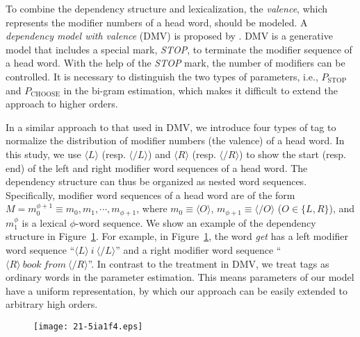 \documentclass[english]{jnlp_1.4}
\begin{document}
To combine the dependency structure and lexicalization, the {\it valence}, which represents the modifier numbers of a head word, should be modeled. A {\it{dependency model with valence}} (DMV) is proposed by \cite{klein2004}. DMV is a generative model that includes a special mark, {\it{STOP}}, to terminate the modifier sequence of a head word. With the help of the {\it STOP} mark, the number of modifiers can be controlled. It is necessary to distinguish the two types of parameters, i.e., $P_{\mathrm{STOP}}$ and $P_{\mathrm{CHOOSE}}$ in the bi-gram estimation, which makes it difficult to extend the approach to higher orders. 

In a similar approach to that used in DMV, we introduce four types of tag to normalize the distribution of modifier numbers (the valence) of a head word. In this study, we use $\langle L \rangle$ (resp. $\langle \slash L \rangle$) and $\langle R \rangle$ (resp. $\langle \slash R \rangle$) to show the start (resp. end) of the left and right modifier word sequences of a head word. 
The dependency structure can thus be organized as nested word sequences.
Specifically, modifier word sequences of a head word are of the form 
$M=m_0^{\phi+1}\equiv m_0, m_1, \cdots, m_{\phi+1}$,
where $m_0\equiv\langle O \rangle$, $m_{\phi+1}\equiv\langle \slash O \rangle$ ($O \in \{L, R\}$), and $m_{1}^{\phi}$ is a lexical $\phi$-word sequence.
We show an example of the dependency structure in Figure~{\ref{T}}. For example, in Figure~\ref{T}, the word {\it get} has a left modifier word sequence ``$\langle L \rangle \ i\ \langle \slash L \rangle$'' and a right modifier word sequence ``$\langle R \rangle\ book\ from\ \langle \slash R \rangle$''.
In contrast to the treatment in DMV, we treat tags as ordinary words in the parameter estimation. This means parameters of our model have a uniform representation, by which our approach can be easily extended to arbitrary high orders.

\begin{figure}[b]
\begin{center}
\texttt{[image: 21-5ia1f4.eps]}
\end{center}
\label{T}
\end{figure}
\end{document}
